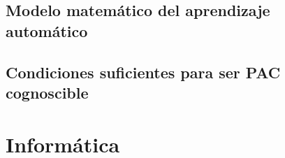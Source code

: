 \documentclass[a4paper,11pt]{report}
\begin{document}
  \chapter{Modelo matemático del aprendizaje automático}
    
    
  \chapter{Condiciones suficientes para ser PAC cognoscible}
    
  
\part{Informática}



\end{document}
